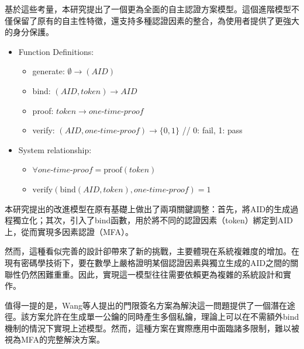 基於這些考量，本研究提出了一個更為全面的自主認證方案模型。這個進階模型不僅保留了原有的自主性特徵，還支持多種認證因素的整合，為使用者提供了更強大的身分保護。
\begin{itemize}
  \item Function Definitions:
        \begin{itemize}
          \item generate: $\emptyset \rightarrow (AID)$
          \item bind: $(AID, token) \rightarrow AID$
          \item proof: $token \rightarrow one\text{-}time\text{-}proof$
          \item verify: $(AID, one\text{-}time\text{-}proof) \rightarrow \{0,1\}$ \hfill // 0: fail, 1: pass
        \end{itemize}
  \item System relationship:
        \begin{itemize}
          \item $\forall one\text{-}time\text{-}proof = \text{proof}(token)$
          \item $\text{verify}(\text{bind}(AID, token), one\text{-}time\text{-}proof) = 1$
        \end{itemize}
\end{itemize}
本研究提出的改進模型在原有基礎上做出了兩項關鍵調整：首先，將AID的生成過程獨立化；其次，引入了bind函數，用於將不同的認證因素（token）綁定到AID上，從而實現多因素認證（MFA）。

然而，這種看似完善的設計卻帶來了新的挑戰，主要體現在系統複雜度的增加。在現有密碼學技術下，要在數學上嚴格證明某個認證因素與獨立生成的AID之間的關聯性仍然困難重重。因此，實現這一模型往往需要依賴更為複雜的系統設計和實作。

值得一提的是，Wang等人\cite{Wang2013ThresholdSignatureSchemes}提出的門限簽名方案為解決這一問題提供了一個潛在途徑。該方案允許在生成單一公鑰的同時產生多個私鑰，理論上可以在不需額外bind機制的情況下實現上述模型。然而，這種方案在實際應用中面臨諸多限制，難以被視為MFA的完整解決方案。
